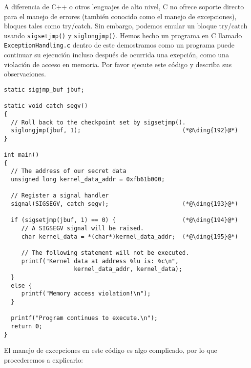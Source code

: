 A diferencia de C++ o otros lenguajes de alto nivel, C no ofrece soporte directo para el manejo de errores (también conocido como el manejo de excepciones), bloques tales como try/catch. 
Sin embargo, podemos emular un bloque try/catch usando \texttt{sigsetjmp()} y \texttt{siglongjmp()}.
Hemos hecho un programa en C llamado \texttt{ExceptionHandling.c} dentro de este demostramos como un programa puede continuar su ejecución incluso después de ocurrida una exepción, como una violación de acceso en memoria. Por favor ejecute este código y describa sus observaciones.

\begin{lstlisting}[caption=\texttt{ExceptionHandling.c}]
static sigjmp_buf jbuf;

static void catch_segv()
{
  // Roll back to the checkpoint set by sigsetjmp().
  siglongjmp(jbuf, 1);                             (*@\ding{192}@*)
}

int main()
{ 
  // The address of our secret data
  unsigned long kernel_data_addr = 0xfb61b000;

  // Register a signal handler
  signal(SIGSEGV, catch_segv);                     (*@\ding{193}@*)

  if (sigsetjmp(jbuf, 1) == 0) {                   (*@\ding{194}@*)
     // A SIGSEGV signal will be raised. 
     char kernel_data = *(char*)kernel_data_addr;  (*@\ding{195}@*)

     // The following statement will not be executed.
     printf("Kernel data at address %lu is: %c\n", 
                    kernel_data_addr, kernel_data);
  }
  else {
     printf("Memory access violation!\n");
  }

  printf("Program continues to execute.\n");
  return 0;
}
\end{lstlisting}

El manejo de excepciones en este código es algo complicado, por lo que procederemos a explicarlo:


